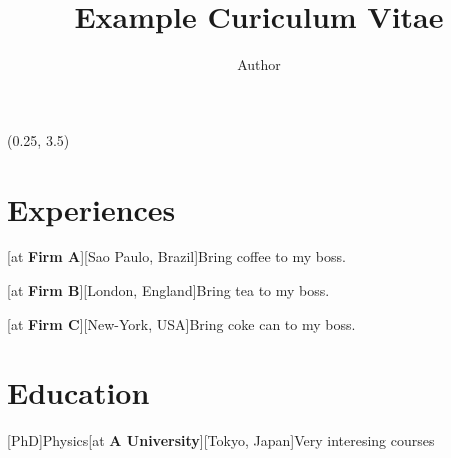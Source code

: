 \documentclass[a4paper]{hamza-cv}
\title{Example Curiculum Vitae}
\author{Author}
\begin{document}
  \makeprofile %

  \begin{textblock}{20.5}(0.25, 3.5)

    \begin{minipage}[t]{0.37\textwidth}










    \end{minipage}\hfill\begin{minipage}[t]{0.61\textwidth}


      \section{Experiences}
        \begin{rightenv}
          [at \textbf{Firm A}][Sao Paulo, Brazil]{Bring coffee to my boss.}

          [at \textbf{Firm B}][London, England]{Bring tea to my boss.}

          [at \textbf{Firm C}][New-York, USA]{Bring coke can to my boss.}
        \end{rightenv}

      \section{Education}
        \begin{rightenv}
          [PhD]{Physics}[at \textbf{A University}][Tokyo, Japan]{Very interesing courses}


\end{rightenv}
\end{minipage}
\end{textblock}
\end{document}
